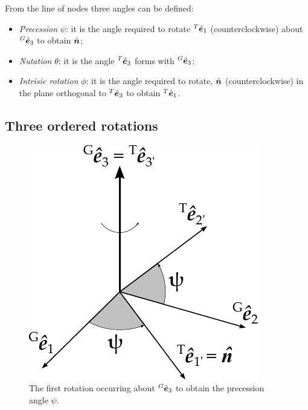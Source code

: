 \begin{appendices}
From the line of nodes three angles can be defined:

\begin{itemize}
    \item \textit{Precession} $\psi$: it is the angle required to rotate  ${^T}{}\hat{\bm{e}}_1$ (counterclockwise) about ${^G}{}\hat{\bm{e}}_3$ to obtain $\hat{\bm{n}}$;
    \item \textit{Nutation} $\theta$: it is the angle ${^T}{}\hat{\bm{e}}_3$ forms with ${^G}{}\hat{\bm{e}}_3$;
    \item \textit{Intrisic rotation} $\phi$: it is the angle required to rotate,  $\hat{\bm{n}}$ (counterclockwise) in the plane orthogonal to ${^T}{}\hat{\bm{e}}_3$ to obtain ${^T}{}\hat{\bm{e}}_1$.
\end{itemize}

\subsection{Three ordered rotations}
\begin{figure}[ht]
    \centering
    \includegraphics{img/XX_appendices/xx_03a.pdf}
    \caption{The first rotation occurring about ${^G}{}\hat{\bm{e}}_3$ to obtain the precession angle $\psi$.}
    \label{fig:euler_first_rotation}
\end{figure}


\end{appendices}
